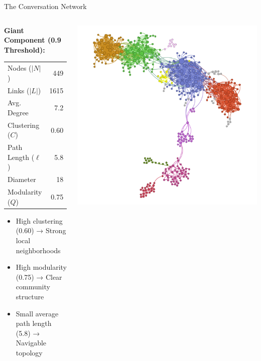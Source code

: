 \documentclass[nodes]{beamer}
\begin{document}
\begin{frame}{The Conversation Network}
  \begin{columns}[T]
    \begin{column}{0.35\textwidth}
      \scriptsize
      \textbf{Giant Component (0.9 Threshold):}
      \vspace{0.1cm}
      \begin{tabular*}{\linewidth}{@{\extracolsep{\fill}} lr}
        \toprule
        Nodes ($|N|$)         & 449 \\
        Links ($|L|$)         & 1615 \\
        Avg. Degree           & 7.2 \\
        Clustering ($C$)      & 0.60 \\
        Path Length ($\ell$)  & 5.8 \\
        Diameter              & 18 \\
        Modularity ($Q$)      & 0.75 \\
        \bottomrule
      \end{tabular*}
      \vspace{0.2cm}
      \begin{itemize}
        \item High clustering (0.60) → \alert{Strong local neighborhoods}
        \item High modularity (0.75) → \alert{Clear community structure}
        \item Small average path length (5.8) → \alert{Navigable topology}
      \end{itemize}
    \end{column}
    \begin{column}{0.65\textwidth}
      \includegraphics[width=\linewidth]{images/cluster-vis.png}

\end{column}
\end{columns}
\end{frame}
\end{document}
